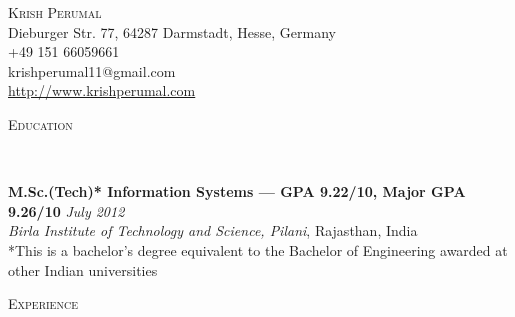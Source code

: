 \documentclass[9pt]{article}
\newenvironment{changemargin}[2]{%
  \begin{list}{}{%
    \setlength{\topsep}{0pt}%
    \setlength{\leftmargin}{#1}%
    \setlength{\rightmargin}{#2}%
    \setlength{\listparindent}{\parindent}%
    \setlength{\itemindent}{\parindent}%
    \setlength{\parsep}{\parskip}%
  }%
  \item[]}{\end{list}
}
\newcommand{\lineover}{
	\begin{changemargin}{-0.05in}{-0.05in}
		\vspace*{-8pt}
		\hrulefill \\
		\vspace*{-2pt}
	\end{changemargin}
}
\newcommand{\header}[1]{
	\begin{changemargin}{-0.5in}{-0.5in}
		\scshape{#1}\\
  	\lineover
	\end{changemargin}
}
\newcommand{\contact}[5]{
	\begin{changemargin}{-0.5in}{-0.5in}
		\begin{center}
			{\Large \scshape {#1}}\\ \smallskip
			{#2}\\ \smallskip 
			{#3}\\ \smallskip
			{#4}\\ \smallskip
			{#5}\\ \smallskip
		\end{center}
	\end{changemargin}
}
\newenvironment{body} {
	\vspace*{-16pt}
	\begin{changemargin}{-0.25in}{-0.5in}
  }	
	{\end{changemargin}
}
\begin{document}
\contact{Krish Perumal}{Dieburger Str. 77, 64287 Darmstadt, Hesse, Germany}{+49 151 66059661}{krishperumal11@gmail.com}{\url{http://www.krishperumal.com}}


% 
% 


\header{Education}

\begin{body}
	\vspace{14pt}
	\textbf{M.Sc.(Tech)* Information Systems --- GPA 9.22/10, Major GPA 9.26/10}{} \hfill \emph{July 2012}{} \\
	\emph{Birla Institute of Technology and Science, Pilani}, Rajasthan, India{} \\
	\smallskip
	\scriptsize{*This is a bachelor's degree equivalent to the Bachelor of Engineering awarded at other Indian universities} \\
\end{body}

\smallskip


\header{Experience}
\end{document}
